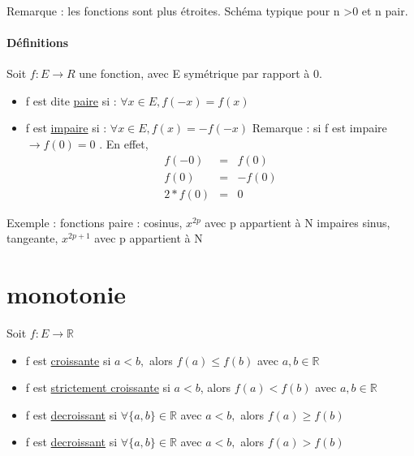 ~\\
~\\
~\\
Remarque : les fonctions sont plus étroites. Schéma typique pour n >0 et n pair.

\paragraph{Définitions} Soit $f:E \rightarrow R$ une fonction, avec E symétrique par rapport à 0.
\begin{itemize}
	\item f est dite \ul{paire} si : $\forall x \in E, f(-x) = f(x)$
	\item f est \ul{impaire} si : $\forall x \in E, f(x) = - f(-x)$ Remarque : si f est impaire $\rightarrow f(0) = 0$ . En effet, 
		\begin{eqnarray}
			f(-0) & = & f(0) \\
			f(0) & = & -f(0) \\
			2*f(0) & = & 0
		\end{eqnarray}
\end{itemize}

Exemple : fonctions paire : cosinus, $x^{2p}$ avec p appartient à N
impaires sinus, tangeante, $x^{2p+1}$ avec p appartient à N

\section{monotonie} Soit $f:E \rightarrow \mathbb{R}$

\begin{itemize}
	\item f est \ul{croissante} si $a < b,$ alors $f(a) \leq f(b)$ avec $a, b \in \mathbb{R}$
	\item f est \ul{strictement croissante} si $a < b$, alors $f(a) < f(b)$ avec $a, b \in \mathbb{R}$
	\item f est \ul{decroissant} si $ \forall \{a, b\} \in \mathbb{R}$ avec $a < b,$ alors $f(a) \geq f(b)$
	\item f est \ul{decroissant} si $ \forall \{a, b\} \in \mathbb{R}$ avec $a < b,$ alors $f(a) > f(b)$
\end{itemize}

